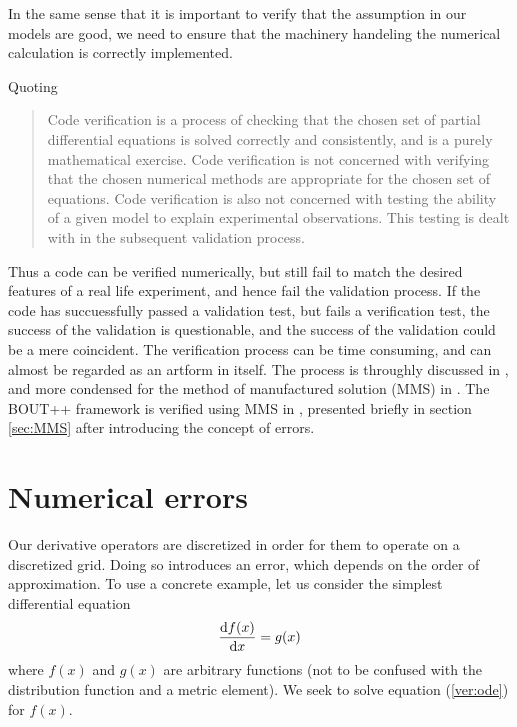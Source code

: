 In the same sense that it is important to verify that the assumption in our
models are good, we need to ensure that the machinery handeling the numerical
calculation is correctly implemented.

Quoting \cite{Dudson2016}

\blockquote{
Code verification is a process of checking that the chosen set of partial
differential equations is solved correctly and consistently, and is a purely
mathematical exercise. Code verification is not concerned with verifying that
the chosen numerical methods are appropriate for the chosen set of equations.
Code verification is also not concerned with testing the ability of a given
model to explain experimental observations. This testing is dealt with in the
subsequent validation process.
}

Thus a code can be verified numerically, but still fail to match the desired
features of a real life experiment, and hence fail the validation process. If
the code has succuessfully passed a validation test, but fails a verification
test, the success of the validation is questionable, and the success of the
validation could be a mere coincident.
The verification process can be time consuming, and can almost be regarded as
an artform in itself. The process is throughly discussed in
\cite{Oberkampf2010book}, and more condensed for the method of manufactured
solution (MMS) in \cite{Salari}. The BOUT++ framework is verified using MMS in
\cite{Dudson2016}, presented briefly in section \ref{sec:MMS} after introducing
the concept of errors.

\section{Numerical errors}
Our derivative operators are discretized in order for them to operate on a discretized
grid. Doing so introduces an error, which depends on the order of
approximation. To use a concrete example, let us consider the simplest
differential equation
%
\begin{align}
    \frac{\text{d}{f(x)}}{\text{d}{x}} = g(x)
    \label{ver:ode}
\end{align}
%
where $f(x)$ and $g(x)$ are arbitrary functions (not to be confused with the
distribution function and a metric element). We seek to solve equation
(\ref{ver:ode}) for $f(x)$.

